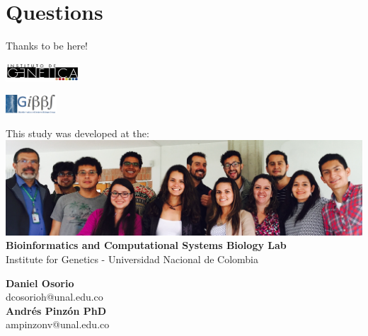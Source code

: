\documentclass[11pt]{beamer}
\begin{document}
\section{Questions}
\begin{frame}{Thanks to be here!}
\begin{multicols}{2}
\includegraphics[height=0.7cm]{logoIG}
\begin{flushright}
\includegraphics[height=0.7cm]{logoGIBBS}
\end{flushright}
\end{multicols}
\begin{center}
This study was developed at the:\\
\includegraphics[width=\textwidth]{GIBBS}\\
\textbf{Bioinformatics and Computational Systems Biology Lab}\\
Institute for Genetics - Universidad Nacional de Colombia
\end{center}
\begin{multicols}{2}
\begin{center}
\textbf{Daniel Osorio}\\
dcosorioh@unal.edu.co\\
\textbf{Andrés Pinzón PhD}\\
ampinzonv@unal.edu.co
\end{center}
\end{multicols}
\end{frame}
\end{document}
